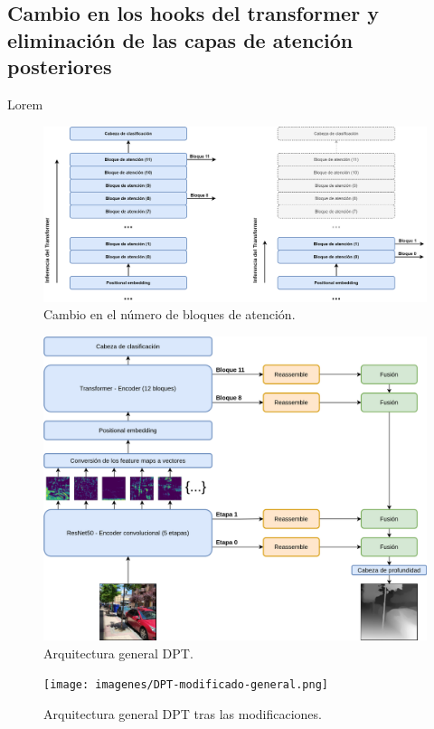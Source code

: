 \documentclass[a4paper, 11pt]{article}
\begin{document}
\subsection{Cambio en los hooks del transformer y eliminación de las capas de atención posteriores}
Lorem
\begin{figure}[H]
\centering
\includegraphics[width=\textwidth]{imagenes/DPT-cambio-bloques-transformer.png}
\caption{Cambio en el número de bloques de atención.}
\label{fig:attention_block_num}
\end{figure}

\begin{figure}[H]
\centering
\includegraphics[width=\textwidth]{imagenes/DPT-general.png}
\caption{Arquitectura general DPT.}
\label{fig:dpt-general}
\end{figure}

\begin{figure}[H]
\centering
\texttt{[image: imagenes/DPT-modificado-general.png]}
\caption{Arquitectura general DPT tras las modificaciones.}
\label{fig:dpt-mod-general}
\end{figure}
\end{document}
